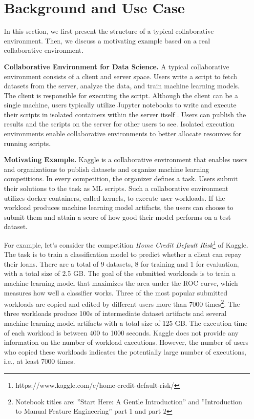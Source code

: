 \section{Background and Use Case} \label{sec-background}
In this section, we first present the structure of a typical collaborative environment.
Then, we discuss a motivating example based on a real collaborative environment.

\textbf{Collaborative Environment for Data Science.}
A typical collaborative environment consists of a client and server space.
Users write a script to fetch datasets from the server, analyze the data, and train machine learning models.
The client is responsible for executing the script.
Although the client can be a single machine, users typically utilize Jupyter notebooks  \cite{Kluyver:2016aa} to write and execute their scripts in isolated containers \cite{merkel2014docker} within the server itself \cite{kagglewebsite, googlecolab, netflix-notebook}.
Users can publish the results and the scripts on the server for other users to see.
Isolated execution environments enable collaborative environments to better allocate resources for running scripts.

\textbf{Motivating Example.}
Kaggle is a collaborative environment that enables users and organizations to publish datasets and organize machine learning competitions.
In every competition, the organizer defines a task.
Users submit their solutions to the task as ML scripts.
Such a collaborative environment utilizes docker containers, called kernels, to execute user workloads.
If the workload produces machine learning model artifacts, the users can choose to submit them and attain a score of how good their model performs on a test dataset.

For example, let's consider the competition \textit{Home Credit Default Risk}\footnote{https://www.kaggle.com/c/home-credit-default-risk/} of Kaggle.
The task is to train a classification model to predict whether a client can repay their loans.
There are a total of 9 datasets, 8 for training and 1 for evaluation, with a total size of 2.5 GB.
The goal of the submitted workloads is to train a machine learning model that maximizes the area under the ROC curve, which measures how well a classifier works.
Three of the most popular submitted workloads are copied and edited by different users more than 7000 times\footnote{Notebook titles are: ''Start Here: A Gentle Introduction'' and ''Introduction to Manual Feature Engineering'' part 1 and part 2}.
The three workloads produce 100s of intermediate dataset artifacts and several machine learning model artifacts with a total size of 125 GB.
The execution time of each workload is between 400 to 1000 seconds.
Kaggle does not provide any information on the number of workload executions.
However, the number of users who copied these workloads indicates the potentially large number of executions, i.e., at least 7000 times.

